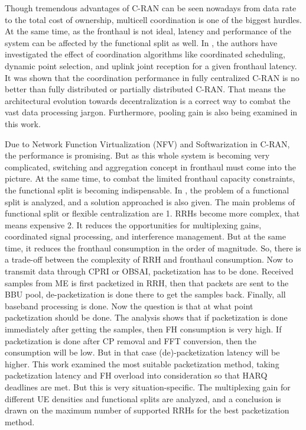 \begin{multicols}{2}
Though tremendous advantages of C-RAN can be seen nowadays from data rate to the total cost of ownership, multicell coordination is one of the biggest hurdles. At the same time, as the fronthaul is not ideal, latency and performance of the system can be affected by the functional split as well. In \cite{art3-key28}, the authors have investigated the effect of coordination algorithms like coordinated scheduling, dynamic point selection, and uplink joint reception for a given fronthaul latency. It was shown that the coordination performance in fully centralized C-RAN is no better than fully distributed or partially distributed C-RAN. That means the architectural evolution towards decentralization is a correct way to combat the vast data processing jargon. Furthermore, pooling gain is also being examined in this work.

Due to Network Function Virtualization (NFV) and Softwarization in C-RAN, the performance is promising. But as this whole system is becoming very complicated, switching and aggregation concept in fronthaul must come into the picture. At the same time, to combat the limited fronthaul capacity constraints, the functional split is becoming indispensable. In \cite{art3-key29}, the problem of a functional split is analyzed, and a solution approached is also given. The main problems of functional split or flexible centralization are 1. RRHs become more complex, that means expensive 2. It reduces the opportunities for multiplexing gains, coordinated signal processing, and interference management. But at the same time, it reduces the fronthaul consumption in the order of magnitude. So, there is a trade-off between the complexity of RRH and fronthaul consumption. Now to transmit data through CPRI or OBSAI, packetization has to be done. Received samples from ME is first packetized in RRH, then that packets are sent to the BBU pool, de-packetization is done there to get the samples back. Finally, all baseband processing is done. Now the question is that at what point packetization should be done. The analysis shows that if packetization is done immediately after getting the samples, then FH consumption is very high. If packetization is done after CP removal and FFT conversion, then the consumption will be low. But in that case (de)-packetization latency will be higher. This work examined the most suitable packetization method, taking packetization latency and FH overload into consideration so that HARQ deadlines are met. But this is very situation-specific. The multiplexing gain for different UE densities and functional splits are analyzed, and a conclusion is drawn on the maximum number of supported RRHs for the best packetization method.


\end{multicols}
